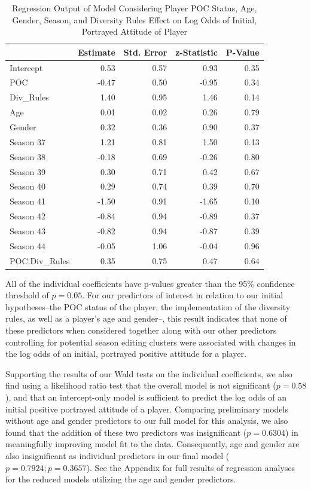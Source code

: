 \documentclass[
  letterpaper,
  DIV=11,
  numbers=noendperiod,
  oneside]{scrartcl}
\begin{document}
\hypertarget{tbl-regression-output}{}
\begin{table}
\caption{\label{tbl-regression-output}Regression Output of Model Considering Player POC Status, Age, Gender,
Season, and Diversity Rules Effect on Log Odds of Initial, Portrayed
Attitude of Player }\tabularnewline

\centering
\begin{tabular}{l|r|r|r|r}
\hline
  & Estimate & Std. Error & z-Statistic & P-Value\\
\hline
Intercept & 0.53 & 0.57 & 0.93 & 0.35\\
\hline
POC & -0.47 & 0.50 & -0.95 & 0.34\\
\hline
Div\_Rules & 1.40 & 0.95 & 1.46 & 0.14\\
\hline
Age & 0.01 & 0.02 & 0.26 & 0.79\\
\hline
Gender & 0.32 & 0.36 & 0.90 & 0.37\\
\hline
Season 37 & 1.21 & 0.81 & 1.50 & 0.13\\
\hline
Season 38 & -0.18 & 0.69 & -0.26 & 0.80\\
\hline
Season 39 & 0.30 & 0.71 & 0.42 & 0.67\\
\hline
Season 40 & 0.29 & 0.74 & 0.39 & 0.70\\
\hline
Season 41 & -1.50 & 0.91 & -1.65 & 0.10\\
\hline
Season 42 & -0.84 & 0.94 & -0.89 & 0.37\\
\hline
Season 43 & -0.82 & 0.94 & -0.87 & 0.39\\
\hline
Season 44 & -0.05 & 1.06 & -0.04 & 0.96\\
\hline
POC:Div\_Rules & 0.35 & 0.75 & 0.47 & 0.64\\
\hline
\end{tabular}
\end{table}

All of the individual coefficients have p-values greater than the 95\%
confidence threshold of \(p=0.05\). For our predictors of interest in
relation to our initial hypotheses--the POC status of the player, the
implementation of the diversity rules, as well as a player's age and
gender--, this result indicates that none of these predictors when
considered together along with our other predictors controlling for
potential season editing clusters were associated with changes in the
log odds of an initial, portrayed positive attitude for a player.

Supporting the results of our Wald tests on the individual coefficients,
we also find using a likelihood ratio test that the overall model is not
significant (\(p=0.58\)), and that an intercept-only model is sufficient
to predict the log odds of an initial positive portrayed attitude of a
player. Comparing preliminary models without age and gender predictors
to our full model for this analysis, we also found that the addition of
these two predictors was insignificant (\(p = 0.6304\)) in meaningfully
improving model fit to the data. Consequently, age and gender are also
insignificant as individual predictors in our final model
(\(p = 0.7924; p = 0.3657\)). See the Appendix for full results of
regression analyses for the reduced models utilizing the age and gender
predictors.
\end{document}
